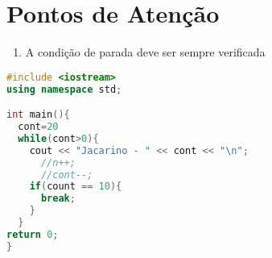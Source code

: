 \documentclass[a4paper, 12pt]{article}
\begin{document}
\section{Pontos de Atenção}

\begin{enumerate}
  \item A condição de parada deve ser sempre verificada
\end{enumerate}

\begin{lstlisting}[language=C++, caption={Utiizando o Break para finalizar o programa}, basicstyle=\ttfamily\footnotesize, frame=single]
#include <iostream>
using namespace std;

int main(){
  cont=20
  while(cont>0){
    cout << "Jacarino - " << cont << "\n";
      //n++;
      //cont--;
    if(count == 10){
      break;
    } 
  }
return 0;
}
\end{lstlisting}
\end{document}
